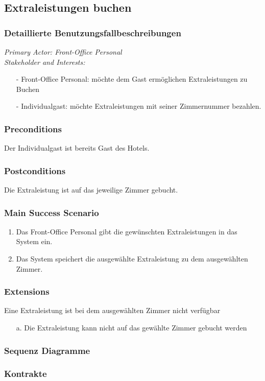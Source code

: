\documentclass[./detailed_overview_usecases.tex]{subfiles}
\begin{document}
    \subsection{Extraleistungen buchen}
    \subsubsection{Detaillierte Benutzungsfallbeschreibungen}
    \textit{Primary Actor: Front-Office Personal}
    \\
    \textit{Stakeholder and Interests:}
    \begin{itemize}
        \item[-] Front-Office Personal: möchte dem Gast ermöglichen Extraleistungen zu Buchen
        \item[-] Individualgast: möchte Extraleistungen mit seiner Zimmernummer bezahlen.
    \end{itemize}

    \subsubsection*{Preconditions}
    Der Individualgast ist bereits Gast des Hotels.

    \subsubsection*{Postconditions}
    Die Extraleistung ist auf das jeweilige Zimmer gebucht.

    \subsubsection*{Main Success Scenario}
    \begin{enumerate}
        \item Das Front-Office Personal gibt die gewünschten Extraleistungen in das System ein.
        \item Das System speichert die ausgewählte Extraleistung zu dem ausgewählten Zimmer.
    \end{enumerate}

    \subsubsection*{Extensions}
    \item Eine Extraleistung ist bei dem ausgewählten Zimmer nicht verfügbar
    \begin{itemize}
        \item[a.] Die Extraleistung kann nicht auf das gewählte Zimmer gebucht werden
    \end{itemize}


    \subsubsection{Sequenz Diagramme}
    \subsubsection{Kontrakte}
\end{document}
